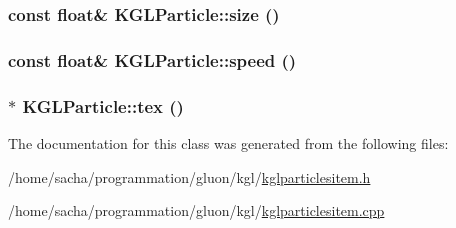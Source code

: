 \hypertarget{class_k_g_l_particle_8597d2785cedd9cb5bb40b7d45510e07}{
\subsubsection[{size}]{\setlength{\rightskip}{0pt plus 5cm}const float\& KGLParticle::size ()}}
\label{class_k_g_l_particle_8597d2785cedd9cb5bb40b7d45510e07}


\hypertarget{class_k_g_l_particle_1a612ce49af0dd6dc80ff224ee9fd2d8}{
\subsubsection[{speed}]{\setlength{\rightskip}{0pt plus 5cm}const float\& KGLParticle::speed ()}}
\label{class_k_g_l_particle_1a612ce49af0dd6dc80ff224ee9fd2d8}


\hypertarget{class_k_g_l_particle_f6e6914d833ff48e1b6ee719a5b15962}{
\subsubsection[{tex}]{$\ast$ KGLParticle::tex ()}}
\label{class_k_g_l_particle_f6e6914d833ff48e1b6ee719a5b15962}




The documentation for this class was generated from the following files:\begin{CompactItemize}
\item 
/home/sacha/programmation/gluon/kgl/\hyperlink{kglparticlesitem_8h}{kglparticlesitem.h}\item 
/home/sacha/programmation/gluon/kgl/\hyperlink{kglparticlesitem_8cpp}{kglparticlesitem.cpp}\end{CompactItemize}
